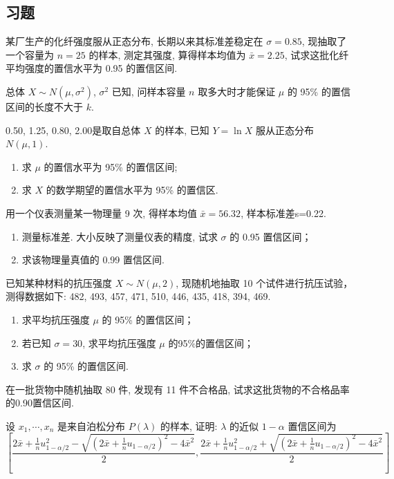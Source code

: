 \subsection{习题}\label{ssec:6.5.6}
\begin{xiti}
\item 某厂生产的化纤强度服从正态分布, 长期以来其标准差稳定在 $\sigma=0.85$, 现抽取了一个容量为 $n=25$ 的样本, 测定其强度, 算得样本均值为 $\bar x=2.25$, 试求这批化纤平均强度的置信水平为 0.95 的置信区间.
    
\item 总体 $X\sim N(\mu,\sigma^2)$, $\sigma^2$ 已知, 问样本容量 $n$ 取多大时才能保证 $\mu$ 的 95\% 的置信区间的长度不大于 $k$.
    
\item 0.50, 1.25, 0.80, 2.00是取自总体 $X$ 的样本, 已知 $Y=\ln X$ 服从正态分布 $N(\mu,1)$.
\begin{enumerate}
  \item 求 $\mu$ 的置信水平为 95\% 的置信区间;
  \item 求 $X$ 的数学期望的置信水平为 95\% 的置信区.
\end{enumerate}

\item 用一个仪表测量某一物理量 9 次, 得样本均值 $\bar x=56.32$, 样本标准差s=0.22.
\begin{enumerate}
  \item 测量标准差. 大小反映了测量仪表的精度, 试求 $\sigma$ 的 0.95 置信区间；
  \item 求该物理量真值的 0.99 置信区间.
\end{enumerate}

\item 已知某种材料的抗压强度 $X\sim N(\mu,2)$, 现随机地抽取 10 个试件进行抗压试验，测得数据如下: 482, 493, 457, 471, 510, 446, 435, 418, 394, 469.
\begin{enumerate}
  \item 求平均抗压强度 $\mu$ 的 95\% 的置信区间；
  \item 若已知  $\sigma=30$, 求平均抗压强度 $\mu$ 的95\%的置信区间；
  \item 求 $\sigma$ 的 95\% 的置信区间.
\end{enumerate}

\item 在一批货物中随机抽取 80 件, 发现有 11 件不合格品, 试求这批货物的不合格品率的0.90置信区间.
    
\item 设 $x_1,\cdots, x_n$ 是来自泊松分布 $P(\lambda)$ 的样本, 证明: $\lambda$ 的近似 $1-\alpha$ 置信区间为
\[\left[\frac{2\bar x+\frac{1}{n}u_{1-\alpha/2}^2-\sqrt{(2\bar x+\frac{1}{n}u_{1-\alpha/2})^2-4\bar{x}^2}}{2},\frac{2\bar x+\frac{1}{n}u_{1-\alpha/2}^2+\sqrt{(2\bar x+\frac{1}{n}u_{1-\alpha/2})^2-4\bar{x}^2}}{2}\right]\]


\end{xiti}
